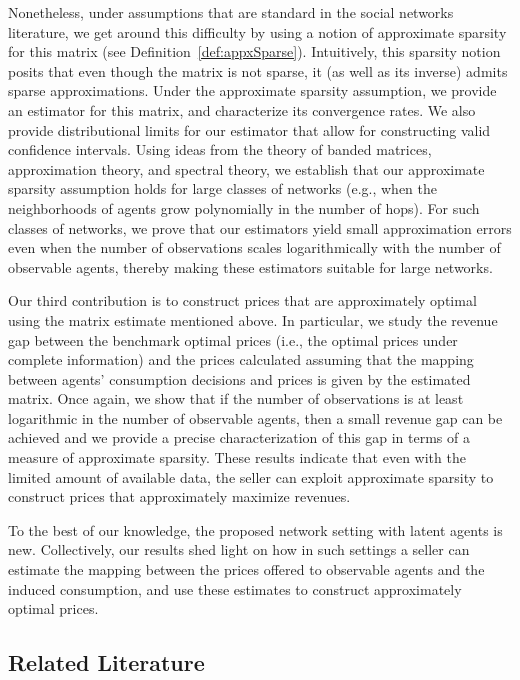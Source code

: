 \documentclass[opre,nonblindrev]{informs3} %
\begin{document}
Nonetheless, under assumptions that are standard in the social networks literature, we get around this difficulty by using  a notion of approximate sparsity for this matrix 
(see Definition~\ref{def:appxSparse}). 
Intuitively, this sparsity notion posits that even though the matrix is not sparse, it (as well as its inverse) admits sparse approximations. Under the approximate sparsity assumption, we provide an estimator for this matrix, and characterize its convergence rates.
We also provide  distributional limits for our estimator that allow for constructing valid confidence intervals.
Using ideas from the theory of banded matrices, approximation theory, and spectral theory,
we establish that our approximate sparsity assumption holds for large classes of networks (e.g., when the neighborhoods of agents grow polynomially in the number of hops).
For such classes of networks, we prove that
our estimators yield small approximation errors
even
when the number of observations scales logarithmically with the number of observable agents, thereby making these estimators suitable for large networks.






Our third contribution is to 
construct prices
that are approximately optimal using the matrix estimate mentioned above. In particular, we study the revenue gap between the
benchmark optimal prices (i.e., the optimal prices under complete information) and the prices
calculated assuming that
the mapping between agents' consumption decisions and prices is given by the estimated matrix.
Once again, we
 show that if the number of observations is at least logarithmic in the number of observable agents, then
a  small revenue gap can be achieved and we provide a precise characterization of this gap in terms of a measure of approximate sparsity.
These results indicate that even with the
limited amount of available data, the seller
can exploit approximate sparsity to construct prices that approximately maximize revenues.



To the best of our knowledge, the proposed network setting with latent agents is new. Collectively, our results shed light on how in such settings a seller can estimate
the mapping between the prices offered to  observable agents and the induced consumption, and use these estimates to construct approximately optimal prices.


\subsection{Related Literature}
\end{document}
